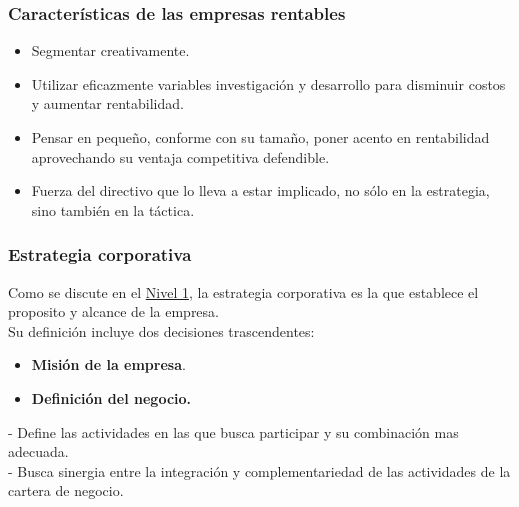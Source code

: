 \documentclass{templateNote}
\begin{document}
\subsubsection{Características de las empresas rentables}
\begin{itemize}
    \item Segmentar creativamente.
    \item Utilizar eficazmente variables investigación y desarrollo para disminuir costos y aumentar rentabilidad.
    \item Pensar en pequeño, conforme con su tamaño, poner acento en rentabilidad aprovechando su ventaja competitiva defendible.
    \item Fuerza del directivo que lo lleva a estar implicado, no sólo en la estrategia, sino también en la táctica.
\end{itemize}

\subsubsection{Estrategia corporativa}
\noindent Como se discute en el \hyperlink{estrategia_corporativa}{Nivel 1}, la estrategia corporativa es la que establece el proposito y alcance de la empresa.\\
Su definición incluye dos decisiones trascendentes:
\begin{itemize}
    \item \textbf{Misión de la empresa}.
    \item \textbf{Definición del negocio.}
\end{itemize}
- Define las actividades en las que busca participar y su combinación mas adecuada.\\
- Busca sinergia entre la integración y complementariedad de las actividades de la cartera de negocio.\\
\end{document}
